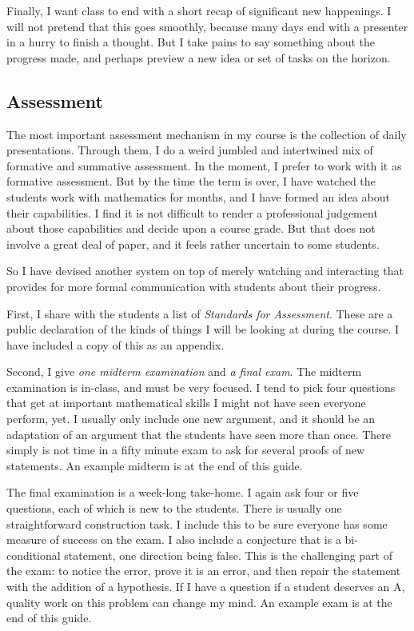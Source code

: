 \documentclass{tufte-handout}
\theoremstyle{definition}
\begin{document}
Finally, I want class to end with a short recap of significant new happenings. I will not pretend that this goes smoothly, because many days end with a presenter in a hurry to finish a thought. But I take pains to say something about the progress made, and perhaps preview a new idea or set of tasks on the horizon.



\subsection{Assessment}

The most important assessment mechanism in my course is the collection of daily presentations. Through them, I do a weird jumbled and intertwined mix of formative and summative assessment. In the moment, I prefer to work with it as formative assessment. But by the time the term is over, I have watched the students work with mathematics for months, and I have formed an idea about their capabilities. I find it is not difficult to render a professional judgement about those capabilities and decide upon a course grade. But that does not involve a great deal of paper, and it feels rather uncertain to some students. 

So I have devised another system on top of merely watching and interacting that provides for more formal communication with students about their progress. 

First, I share with the students a list of \emph{Standards for Assessment}. These are a public declaration of the kinds of things I will be looking at during the course. I have included a copy of this as an appendix.

Second, I give \emph{one midterm examination} and \emph{a final exam}.
The midterm examination is in-class, and must be very focused.
I tend to pick four questions that get at important mathematical skills I might not have seen everyone perform, yet.
I usually only include one new argument, and it should be an adaptation of an argument that the students have seen more than once.
There simply is not time in a fifty minute exam to ask for several proofs of new statements.
An example midterm is at the end of this guide.

The final examination is a week-long take-home.
I again ask four or five questions, each of which is new to the students.
There is usually one straightforward construction task.
I include this to be sure everyone has some measure of success on the exam.
I also include a conjecture that is a bi-conditional statement, one direction being false.
This is the challenging part of the exam: to notice the error, prove it is an error, and then repair the statement with the addition of a hypothesis.
If I have a question if a student deserves an A, quality work on this problem can change my mind.
An example exam is at the end of this guide.
\end{document}
